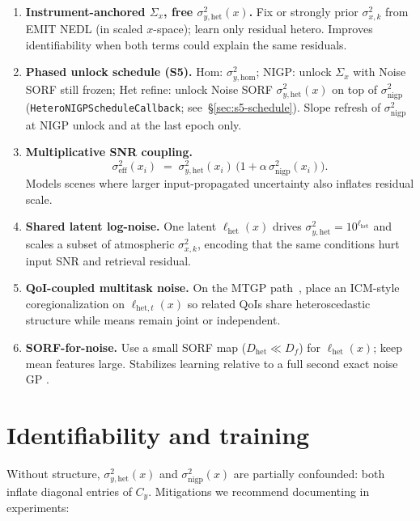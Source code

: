 \documentclass[11pt]{article}
\newcommand{\sighet}{\sigma_{y,\mathrm{het}}^{2}}%
\newcommand{\signigp}{\sigma_{\mathrm{nigp}}^{2}}%
\newcommand{\sigeff}{\sigma_{\mathrm{eff}}^{2}}%
\newcommand{\Sigx}{\Sigma_{x}}%
\newcommand{\Cy}{C_{y}}%
\begin{document}
\begin{enumerate}[leftmargin=1.2em,itemsep=0.45em]
  \item \textbf{Instrument-anchored $\Sigx$, free $\sighet(x)$.}
  Fix or strongly prior $\sigma_{x,k}^{2}$ from EMIT NEDL (in scaled $x$-space); learn only residual
  hetero. Improves identifiability when both terms could explain the same residuals.

  \item \textbf{Phased unlock schedule (S5).}
  Hom: $\sigma_{y,\mathrm{hom}}^{2}$;
  NIGP: unlock $\Sigx$ with Noise SORF still frozen;
  Het refine: unlock Noise SORF $\sighet(x)$ on top of $\signigp$
  (\texttt{HeteroNIGPScheduleCallback}; see~\S\ref{sec:s5-schedule}).
  Slope refresh of $\signigp$ at NIGP unlock and at the last epoch only.

  \item \textbf{Multiplicative SNR coupling.}
  \[
    \sigeff(x_i)
    \;=\;
    \sighet(x_i)\,
    \bigl(1+\alpha\,\signigp(x_i)\bigr).
  \]
  Models scenes where larger input-propagated uncertainty also inflates residual scale.

  \item \textbf{Shared latent log-noise.}
  One latent $\ell_{\mathrm{het}}(x)$ drives $\sighet=10^{\ell_{\mathrm{het}}}$ and scales a subset of atmospheric
  $\sigma_{x,k}^{2}$, encoding that the same conditions hurt input SNR and retrieval residual.

  \item \textbf{QoI-coupled multitask noise.}
  On the MTGP path~\cite{bonilla2008mtgp}, place an ICM-style coregionalization on
  $\ell_{\mathrm{het},t}(x)$ so related QoIs share heteroscedastic structure while means remain joint
  or independent.

  \item \textbf{SORF-for-noise.}
  Use a small SORF map ($D_{\mathrm{het}}\ll D_f$) for $\ell_{\mathrm{het}}(x)$; keep mean features large.
  Stabilizes learning relative to a full second exact noise GP
  \cite{goldberg1998heteroscedastic,lazaro2011vhgp}.
\end{enumerate}

\section{Identifiability and training}

Without structure, $\sighet(x)$ and $\signigp(x)$ are partially confounded: both inflate
diagonal entries of $\Cy$.
Mitigations we recommend documenting in experiments:
\end{document}
